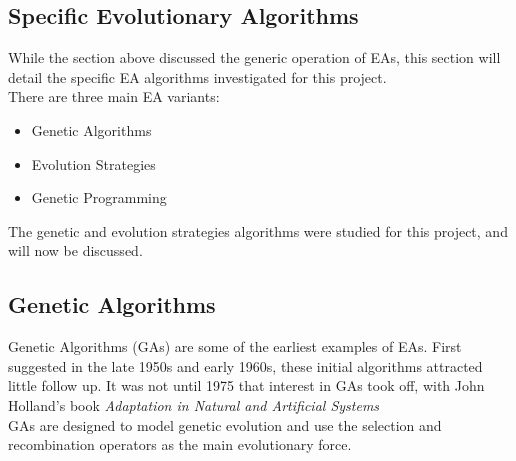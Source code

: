 \subsection{Specific Evolutionary Algorithms}
While the section above discussed the generic operation of EAs, this section will detail the specific EA algorithms investigated for this project.
\\There are three main EA variants:
\begin{itemize}
  \item{Genetic Algorithms}
  \item{Evolution Strategies}
  \item{Genetic Programming}
\end{itemize}
The genetic and evolution strategies algorithms were studied for this project, and will now be discussed.

\subsection{Genetic Algorithms}
Genetic Algorithms (GAs) are some of the earliest examples of EAs. First suggested in the late 1950s and early 1960s, these initial algorithms attracted little follow up. It was not until 1975 that interest in GAs took off, with John Holland's book \emph{Adaptation in Natural and Artificial Systems}\cite{4-ga, gahist, pga1}
\\GAs are designed to model genetic evolution and use the selection and recombination operators as the main evolutionary force\cite{4-ga}.

